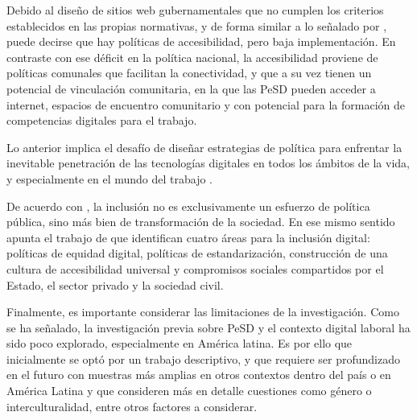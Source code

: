 Debido al diseño de sitios web gubernamentales que no cumplen los
criterios establecidos en las propias normativas, y de forma similar a
lo señalado por \textcite{LIN2018}, puede decirse que hay políticas de
accesibilidad, pero baja implementación. En contraste con ese déficit en
la política nacional, la accesibilidad proviene de políticas comunales
que facilitan la conectividad, y que a su vez tienen un potencial de
vinculación comunitaria, en la que las PeSD pueden acceder a internet,
espacios de encuentro comunitario y con potencial para la formación de
competencias digitales para el trabajo.

Lo anterior implica el desafío de diseñar estrategias de política para
enfrentar la inevitable penetración de las tecnologías digitales en
todos los ámbitos de la vida, y especialmente en el mundo del trabajo
\cite{PEREZROLDAN2021}.

De acuerdo con \textcite[p. 4438]{LIN2018}, la inclusión no es
exclusivamente un esfuerzo de política pública, sino más bien de
transformación de la sociedad. En ese mismo sentido apunta el trabajo de
\textcite[p. 3]{KOLOTOUCHKINA2022} que identifican cuatro
áreas para la inclusión digital: políticas de equidad digital, políticas
de estandarización, construcción de una cultura de accesibilidad
universal y compromisos sociales compartidos por el Estado, el sector
privado y la sociedad civil.

Finalmente, es importante considerar las limitaciones de la
investigación. Como se ha señalado, la investigación previa sobre PeSD y
el contexto digital laboral ha sido poco explorado, especialmente en
América latina. Es por ello que inicialmente se optó por un trabajo
descriptivo, y que requiere ser profundizado en el futuro con muestras
más amplias en otros contextos dentro del país o en América Latina y que
consideren más en detalle cuestiones como género o interculturalidad,
entre otros factores a considerar.